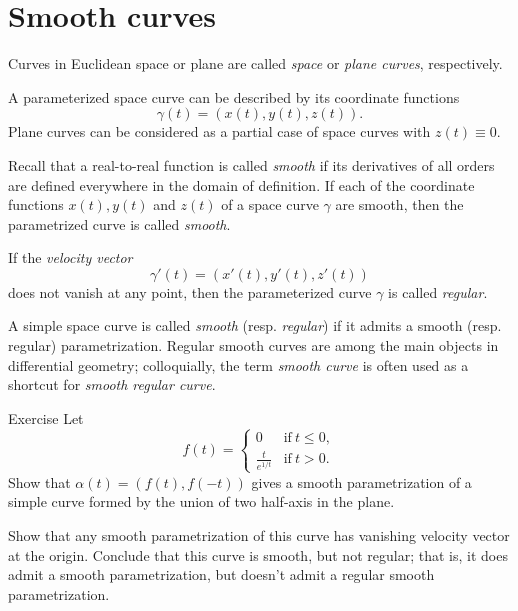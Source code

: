 \section{Smooth curves}

Curves in Euclidean space or plane are called \emph{space} or \emph{plane curves}, respectively.

A parameterized space curve can be described by its coordinate functions 
\[\gamma(t)=(x(t),y(t),z(t)).\]
Plane curves can be considered as a partial case of space curves with $z(t)\equiv 0$.

Recall that a real-to-real function is called \emph{smooth} if its derivatives of all orders are defined everywhere in the domain of definition.  
If each of the coordinate functions $x(t), y(t)$ and $z(t)$ of a space curve $\gamma$ are smooth, then the parametrized curve is called \emph{smooth}.

If the \emph{velocity vector} 
\[\gamma'(t)=(x'(t),y'(t),z'(t))\] 
does not vanish at any point, then the parameterized curve $\gamma$ is called \emph{regular}.

A simple space curve is called \emph{smooth} (resp. \emph{regular}) if it admits a smooth (resp. regular) parametrization.
Regular smooth curves are among the main objects in differential geometry;
colloquially, the term \emph{smooth curve} is often used as a shortcut for {}\emph{smooth regular curve}. 

\begin{thm}{Exercise}\label{ex:L-shape}
Let 
\[f(t)=
\begin{cases}
0&\text{if}\ t\le 0,
\\
\frac{t}{e^{1\!/\!t}}&\text{if}\ t> 0.
\end{cases}
\]
Show that $\alpha(t)=(f(t),f(-t))$ gives a smooth parametrization of a simple curve formed by the union of two half-axis in the plane.

Show that any smooth parametrization of this curve has vanishing velocity vector at the origin.
Conclude that this curve is smooth, but not regular;
that is, it does admit a smooth parametrization, but doesn't admit a regular smooth parametrization.
\end{thm}


